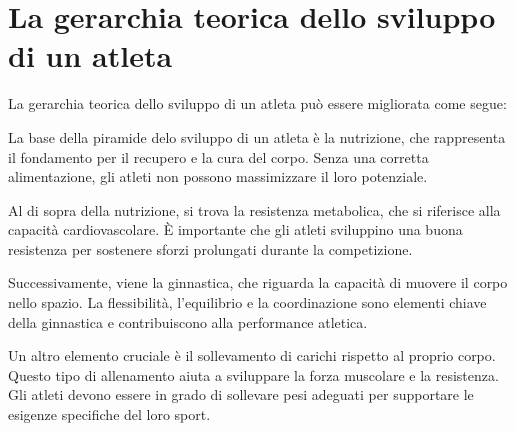 \documentclass[12pt,oneside,a4paper]{article}
\begin{document}
\section{La gerarchia teorica dello sviluppo di un atleta} \label{sec:aleben}
La gerarchia teorica dello sviluppo di un atleta può essere migliorata come segue: 

La base della piramide delo sviluppo di un atleta è la nutrizione, che rappresenta il fondamento per il recupero e la cura del corpo. Senza una corretta alimentazione, gli atleti non possono massimizzare il loro potenziale. 

Al di sopra della nutrizione, si trova la resistenza metabolica, che si riferisce alla capacità cardiovascolare. È importante che gli atleti sviluppino una buona resistenza per sostenere sforzi prolungati durante la competizione. 

Successivamente, viene la ginnastica, che riguarda la capacità di muovere il corpo nello spazio. La flessibilità, l'equilibrio e la coordinazione sono elementi chiave della ginnastica e contribuiscono alla performance atletica. 

Un altro elemento cruciale è il sollevamento di carichi rispetto al proprio corpo. Questo tipo di allenamento aiuta a sviluppare la forza muscolare e la resistenza. Gli atleti devono essere in grado di sollevare pesi adeguati per supportare le esigenze specifiche del loro sport. 
\end{document}
